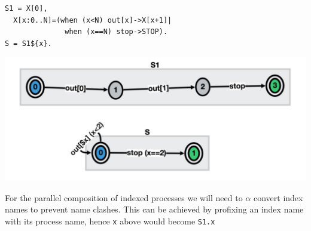\documentclass[]{article}
\begin{document}
\begin{minipage}{0.55\textwidth}
\begin{verbatim}
S1 = X[0],
  X[x:0..N]=(when (x<N) out[x]->X[x+1]|
              when (x==N) stop->STOP).
S = S1${x}.
   \end{verbatim} 
\end{minipage}\begin{minipage}{0.4\textwidth}
\begin{center}\includegraphics[scale=0.2]{VarBug.jpg}\end{center}
\end{minipage}



For the parallel composition of indexed processes we will need to $\alpha$ convert index names to prevent name clashes. This can be achieved by profixing an index name with its process name, hence \verb|x| above would become \verb|S1.x|
\end{document}
